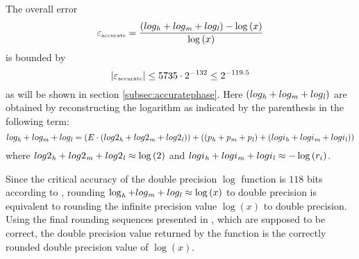 The overall error 
$$\epsilon_{\mbox{\tiny accurate}} = \frac{\left( log_\hi + log_\mi + log_\lo \right) - \log\left( x \right)}{\log\left( x \right)}$$
is bounded by 
$$\left \vert \epsilon_{\mbox{\tiny accurate}} \right \vert \leq 5735 \cdot 2^{-132} \leq 2^{-119.5}$$
as will be shown in section \ref{subsec:accuratephase}. Here $\left( log_\hi + log_\mi + log_\lo \right)$ 
are obtained by reconstructing the logarithm as indicated by the parenthesis in the following term:
$$log_\hi + log_\mi + log_\lo = \left(E \cdot \left( log2_\hi + log2_\mi + log2_\lo \right) \right) + 
\left( \left( p_\hi + p_\mi + p_\lo \right) + \left(logi_\hi + logi_\mi + logi_\lo \right) \right)$$
where
$log2_\hi + log2_\mi + log2_\lo \approx \log\left( 2 \right)$ and $logi_\hi + logi_\mi + logi_\lo \approx -\log\left(r_i \right)$.

Since the critical accuracy of the double precision $\log$ function is $118$ bits according to 
\cite{DinDefLau2004LIP}, rounding $\log_\hi + log_\mi + log_\lo \approx \log\left( x \right)$ to double precision is equivalent 
to rounding the infinite precision value $\log\left( x \right)$ to double precision. 
Using the final rounding sequences presented in \cite{Lauter2005LIP:tripledouble}, which are supposed to be correct, 
the double precision value returned by the function is the correctly rounded double precision value of 
$\log\left( x \right)$.



